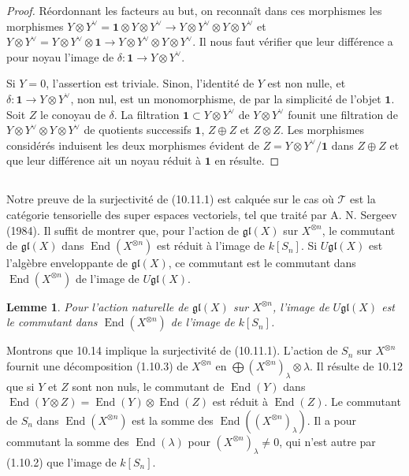 \documentclass[11pt,a4paper]{article}
\theoremstyle{plain}
\newtheorem{lemma}[theorem]{Lemme}
\theoremstyle{definition}
\DeclareMathOperator{\End}{End}
\begin{document}
\begin{proof}
R\'eordonnant les facteurs au but, on reconna\^it dans ces morphismes les morphismes $Y \otimes Y^\vee = \mathbf{1} \otimes Y \otimes Y^\vee \to Y \otimes Y^\vee \otimes Y \otimes Y^\vee$ et $Y \otimes Y^\vee = Y \otimes Y^\vee \otimes \mathbf{1} \to Y \otimes Y^\vee \otimes Y \otimes Y^\vee$. Il nous faut v\'erifier que leur diff\'erence a pour noyau l'image de $\delta : \mathbf{1} \to Y \otimes Y^\vee$.

Si $Y = 0$, l'assertion est triviale. Sinon, l'identit\'e de $Y$ est non nulle, et $\delta : \mathbf{1} \to Y \otimes Y^\vee$, non nul, est un monomorphisme, de par la simplicit\'e de l'objet $\mathbf{1}$. Soit $Z$ le conoyau de $\delta$. La filtration $\mathbf{1} \subset Y \otimes Y^\vee$ de $Y \otimes Y^\vee$ founit une filtration de $Y \otimes Y^\vee \otimes Y \otimes Y^\vee$ de quotients successifs $\mathbf{1}$, $Z \oplus Z$ et $Z \otimes Z$. Les morphismes consid\'er\'es induisent les deux morphismes \'evident de $Z = Y \otimes Y^\vee / \mathbf{1}$ dans $Z \oplus Z$ et que leur diff\'erence ait un noyau r\'eduit \`a $\mathbf{1}$ en r\'esulte.
\end{proof}

\subsection{}
Notre preuve de la surjectivit\'e de (10.11.1) est calqu\'ee sur le cas o\`u $\mathcal{T}$ est la cat\'egorie tensorielle des super espaces vectoriels, tel que trait\'e par A. N. Sergeev (1984). Il suffit de montrer que, pour l'action de $\mathfrak{gl}(X)$ sur $X^{\otimes n}$, le commutant de $\mathfrak{gl}(X)$ dans $\End(X^{\otimes n})$ est r\'eduit \`a l'image de $k[S_n]$. Si $U\mathfrak{gl}(X)$ est l'alg\`ebre enveloppante de $\mathfrak{gl}(X)$, ce commutant est le commutant dans $\End(X^{\otimes n})$ de l'image de $U\mathfrak{gl}(X)$.

\begin{lemma}
Pour l'action naturelle de $\mathfrak{gl}(X)$ sur $X^{\otimes n}$, l'image de $U\mathfrak{gl}(X)$ est le commutant dans $\End(X^{\otimes n})$ de l'image de $k[S_n]$.
\end{lemma}

Montrons que 10.14 implique la surjectivit\'e de (10.11.1). L'action de $S_n$ sur $X^{\otimes n}$ fournit une d\'ecomposition (1.10.3) de $X^{\otimes n}$ en $\bigoplus (X^{\otimes n})_\lambda \otimes \lambda$. Il r\'esulte de 10.12 que si $Y$ et $Z$ sont non nuls, le commutant de $\End(Y)$ dans $\End(Y \otimes Z) = \End(Y) \otimes \End(Z)$ est r\'eduit \`a $\End(Z)$. Le commutant de $S_n$ dans $\End(X^{\otimes n})$ est la somme des $\End((X^{\otimes n})_\lambda)$. Il a pour commutant la somme des $\End(\lambda)$ pour $(X^{\otimes n})_\lambda \neq 0$, qui n'est autre par (1.10.2) que l'image de $k[S_n]$.
\end{document}
